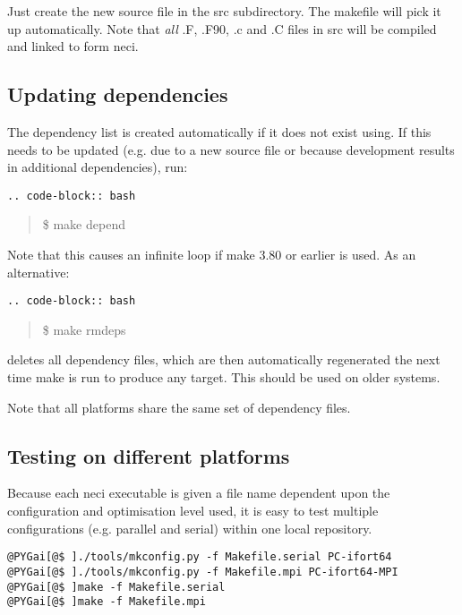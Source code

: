 \documentclass[openany,a4paper,10pt,english]{manual}
\begin{document}
Just create the new source file in the src subdirectory.  The makefile will
pick it up automatically.  Note that \emph{all} .F, .F90, .c and .C files in src
will be compiled and linked to form neci.


\subsection{Updating dependencies}

The dependency list is created automatically if it does not exist using.  If this
needs to be updated (e.g. due to a new source file or because development results in
additional dependencies), run:

\begin{Verbatim}[commandchars=@\[\]]
.. code-block:: bash
\end{Verbatim}
\begin{quote}

\$ make depend
\end{quote}

Note that this causes an infinite loop if make 3.80 or earlier is used.  As an alternative:

\begin{Verbatim}[commandchars=@\[\]]
.. code-block:: bash
\end{Verbatim}
\begin{quote}

\$ make rmdeps
\end{quote}

deletes all dependency files, which are then automatically regenerated the next time make
is run to produce any target.  This should be used on older systems.

Note that all platforms share the same set of dependency files.


\subsection{Testing on different platforms}

Because each neci executable is given a file name dependent upon the
configuration and optimisation level used, it is easy to test multiple
configurations (e.g. parallel and serial) within one local repository.

\begin{Verbatim}[commandchars=@\[\]]
@PYGai[@$ ]./tools/mkconfig.py -f Makefile.serial PC-ifort64
@PYGai[@$ ]./tools/mkconfig.py -f Makefile.mpi PC-ifort64-MPI
@PYGai[@$ ]make -f Makefile.serial
@PYGai[@$ ]make -f Makefile.mpi
\end{Verbatim}
\end{document}

